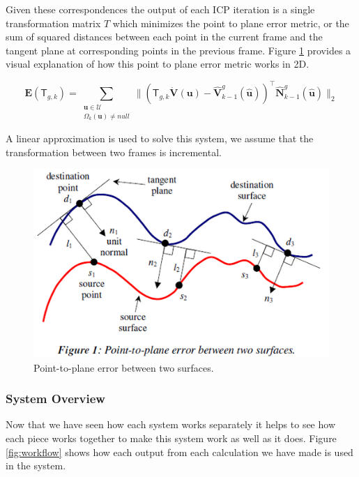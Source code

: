 \documentclass[10pt, twocolumn]{article}
\begin{document}
Given these correspondences the output of each ICP iteration is a single transformation matrix $T$ which minimizes the point to plane error metric, or the sum of squared distances between each point in the current frame and the tangent plane at corresponding points in the previous frame. Figure \ref{fig:pointplane} \cite{Low04linearleast-squares} provides a visual explanation of how this point to plane error metric works in 2D.

\begin{equation}
\mathbf{E}(\mathsf{T}_{g,k}) = 
\sum_{\substack{
   \mathbf{u} \in \mathcal{U} \\
   \Omega_{k}(\mathbf{u}) \neq null
  }}
  \| ( \mathsf{T}_{g,k} \mathbf{\dot{V}} (\mathbf{u}) - \mathbf{\hat{V}}^{g}_{k-1} (\mathbf{\hat{u}}))^{\top} \mathbf{\hat{N}}^{g}_{k-1} (\mathbf{\hat{u}}) \|_{2}
\end{equation}


A linear approximation is used to solve this system, we assume that the transformation between two frames is incremental.

\begin{figure}
  \centering
  \includegraphics[width=1.0\linewidth]{pointplane}
  \caption{Point-to-plane error between two surfaces.}
  \label{fig:pointplane}
\end{figure}

\subsubsection{System Overview}
Now that we have seen how each system works separately it helps to see how each
piece works together to make this system work as well as it does. Figure
\ref{fig:workflow} shows how each output from each calculation we have made is
used in the system. 
\end{document}
